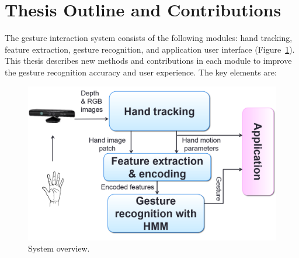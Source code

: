 \section{Thesis Outline and Contributions}
The gesture interaction system consists of the following modules: hand tracking, 
feature extraction, gesture recognition, and application user interface
(Figure~\ref{fig:overview}). This thesis describes new methods and
contributions in each module to improve the gesture recognition accuracy and
user experience. The key elements are:

\begin{figure}[h]
\centering
\includegraphics[width=\linewidth]{figures/system_overview.png}
\caption{System overview.}
\label{fig:overview}
\end{figure}

